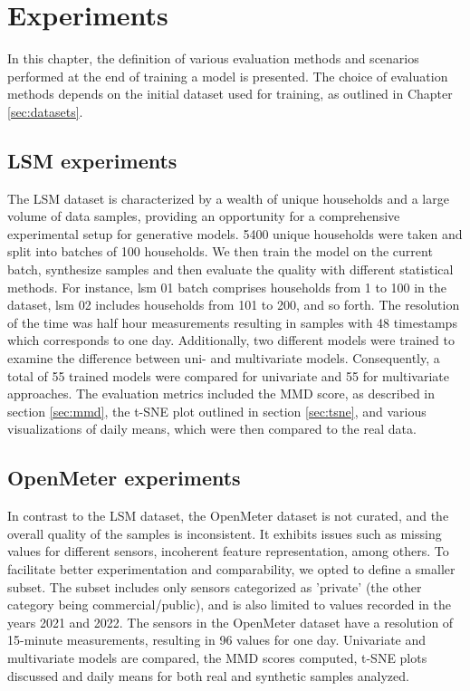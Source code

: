 \chapter{Experiments}
\label{sec:experiments}
In this chapter, the definition of various evaluation methods and scenarios performed at the end of training a model is presented. The choice of evaluation methods depends on the initial dataset used for training, as outlined in Chapter \ref{sec:datasets}.

\section{LSM experiments}
The LSM dataset is characterized by a wealth of unique households and a large volume of data samples, providing an opportunity for a comprehensive experimental setup for generative models.
5400 unique households were taken and split into batches of 100 households. We then train the model on the current batch, synthesize samples and then evaluate the quality with different statistical methods.
For instance, lsm 01 batch comprises households from 1 to 100 in the dataset, lsm 02 includes households from 101 to 200, and so forth. The resolution of the time was half hour measurements resulting in samples with 48 timestamps which corresponds to one day. Additionally, two different models were trained to examine the difference between uni- and multivariate models. Consequently, a total of 55 trained models were compared for univariate and 55 for multivariate approaches. The evaluation metrics included the MMD score, as described in section \ref{sec:mmd}, the t-SNE plot outlined in section \ref{sec:tsne}, and various visualizations of daily means, which were then compared to the real data.

\section{OpenMeter experiments}
In contrast to the LSM dataset, the OpenMeter dataset is not curated, and the overall quality of the samples is inconsistent. It exhibits issues such as missing values for different sensors, incoherent feature representation, among others. To facilitate better experimentation and comparability, we opted to define a smaller subset.
The subset includes only sensors categorized as 'private' (the other category being commercial/public), and is also limited to values recorded in the years 2021 and 2022. The sensors in the OpenMeter dataset have a resolution of 15-minute measurements, resulting in 96 values for one day. Univariate and multivariate models are compared, the MMD scores computed, t-SNE plots discussed and daily means for both real and synthetic samples analyzed.

